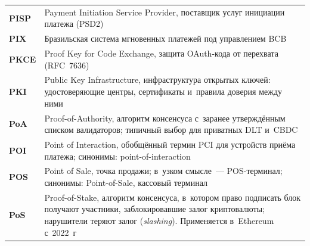 \begin{longtable}{@{}p{4.5em}p{\dimexpr\linewidth-4.5em-2\tabcolsep\relax}@{}}
  \textbf{PISP}              & Payment Initiation Service Provider, поставщик услуг инициации платежа (PSD2)                                                                                                                                                                                                                    \\
  \textbf{PIX}               & Бразильская система мгновенных платежей под управлением BCB                                                                                                                                                                                                                                      \\
  \textbf{PKCE}              & Proof Key for Code Exchange, защита OAuth-кода от перехвата (RFC~7636)                                                                                                                                                                                                                           \\
  \textbf{PKI}               & Public Key Infrastructure, инфраструктура открытых ключей: удостоверяющие центры, сертификаты и~правила доверия между ними                                                                                                                                                                       \\
  \textbf{PoA}               & Proof-of-Authority, алгоритм консенсуса с~заранее утверждённым списком валидаторов; типичный выбор для приватных DLT и~CBDC                                                                                                                                                                      \\
  \textbf{POI}               & Point of Interaction, обобщённый термин PCI для устройств приёма платежа; синонимы: point-of-interaction                                                                                                                                                                                         \\
  \textbf{POS}               & Point of Sale, точка продажи; в~узком смысле~--- POS-терминал; синонимы: Point-of-Sale, кассовый терминал                                                                                                                                                                                         \\
  \textbf{PoS}               & Proof-of-Stake, алгоритм консенсуса, в~котором право подписать блок получают участники, заблокировавшие залог криптовалюты; нарушители теряют залог (\textit{slashing}). Применяется в~Ethereum с~2022~г \\

\end{longtable}
